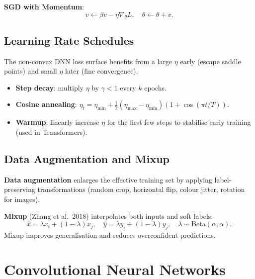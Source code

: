 \documentclass[oneside]{book}
\begin{document}
\textbf{SGD with Momentum}:
\[
    v \leftarrow \beta v - \eta \nabla_\theta L, \quad
    \theta \leftarrow \theta + v.
\]


\section{Learning Rate Schedules}

The non-convex DNN loss surface benefits from a large $\eta$ early
(escape saddle points) and small $\eta$ later (fine convergence).

\begin{itemize}
  \item \textbf{Step decay}: multiply $\eta$ by $\gamma < 1$ every $k$ epochs.
  \item \textbf{Cosine annealing}:
        $\eta_t = \eta_{\min} + \tfrac{1}{2}(\eta_{\max}-\eta_{\min})
        (1+\cos(\pi t/T))$.
  \item \textbf{Warmup}: linearly increase $\eta$ for the first few steps to
        stabilise early training (used in Transformers).
\end{itemize}

\section{Data Augmentation and Mixup}

\textbf{Data augmentation} enlarges the effective training set by applying
label-preserving transformations (random crop, horizontal flip, colour
jitter, rotation for images).

\textbf{Mixup} (Zhang et al.\ 2018) interpolates both inputs and soft labels:
\[
    \hat x = \lambda x_i + (1-\lambda) x_j, \quad
    \hat y = \lambda y_i + (1-\lambda) y_j, \quad
    \lambda \sim \mathrm{Beta}(\alpha,\alpha).
\]
Mixup improves generalisation and reduces overconfident predictions.

\chapter{Convolutional Neural Networks}
\end{document}
